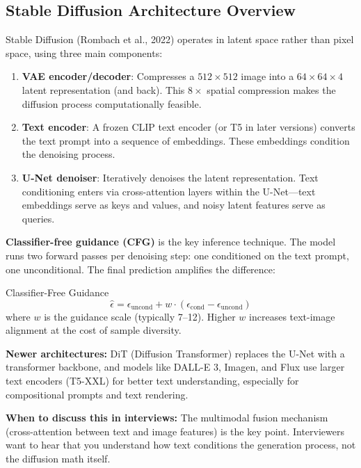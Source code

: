 \subsection{Stable Diffusion Architecture Overview}

Stable Diffusion (Rombach et al., 2022) operates in latent space rather than pixel space, using three main components:

\begin{enumerate}
    \item \textbf{VAE encoder/decoder}: Compresses a $512 \times 512$ image into a $64 \times 64 \times 4$ latent representation (and back). This $8\times$ spatial compression makes the diffusion process computationally feasible.

    \item \textbf{Text encoder}: A frozen CLIP text encoder (or T5 in later versions) converts the text prompt into a sequence of embeddings. These embeddings condition the denoising process.

    \item \textbf{U-Net denoiser}: Iteratively denoises the latent representation. Text conditioning enters via cross-attention layers within the U-Net---text embeddings serve as keys and values, and noisy latent features serve as queries.
\end{enumerate}

\textbf{Classifier-free guidance (CFG)} is the key inference technique. The model runs two forward passes per denoising step: one conditioned on the text prompt, one unconditional. The final prediction amplifies the difference:

\begin{mathresult}{Classifier-Free Guidance}
\begin{equation}
\hat{\epsilon} = \epsilon_{\text{uncond}} + w \cdot (\epsilon_{\text{cond}} - \epsilon_{\text{uncond}})
\end{equation}
where $w$ is the guidance scale (typically 7--12). Higher $w$ increases text-image alignment at the cost of sample diversity.
\end{mathresult}

\textbf{Newer architectures:} DiT (Diffusion Transformer) replaces the U-Net with a transformer backbone, and models like DALL-E 3, Imagen, and Flux use larger text encoders (T5-XXL) for better text understanding, especially for compositional prompts and text rendering.

\textbf{When to discuss this in interviews:} The multimodal fusion mechanism (cross-attention between text and image features) is the key point. Interviewers want to hear that you understand how text conditions the generation process, not the diffusion math itself.

